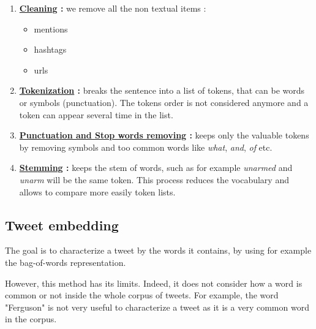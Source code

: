 \documentclass[a4paper,twoside,12pt,openright]{report}
\begin{document}
\begin{enumerate}
\item \textbf{\underline{Cleaning} :} we remove all the non textual items : 
  \begin{itemize}
    \item mentions
    \item hashtags
    \item urls
  \end{itemize}
\item \textbf{\underline{Tokenization} :} breaks the sentence into a list of tokens, that can be words or symbols (punctuation). The tokens order is not considered anymore and a token can appear several time in the list.  \\[10pt]
\item \textbf{\underline{Punctuation and Stop words removing} :}  keeps only the valuable tokens by removing symbols and too common words like \emph{what}, \emph{and}, \emph{of} etc.\\[10pt]
\item \textbf{\underline{Stemming} :} keeps the stem of words, such as for example \emph{unarmed} and \emph{unarm} will be the same token. This process reduces the vocabulary and allows to compare more easily token lists.\\[10pt]

\end{enumerate}

\newpage

\subsection{Tweet embedding}
\label{tweetEmbeddingSection}

The goal is to characterize a tweet by the words it contains, by using for example the bag-of-words representation.

However, this method has its limits. Indeed, it does not consider how a word is common or not inside the whole corpus of tweets. For example, the word "Ferguson" is not very useful to characterize a tweet as it is a very common word in the corpus.
\end{document}
